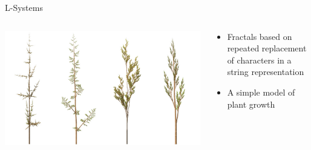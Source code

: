 \begin{frame}{L-Systems}
	\begin{columns}
		\begin{column}{0.4\textwidth}
			\includegraphics[width=\textwidth]{lsystem}
		\end{column}
		\begin{column}{0.55\textwidth}
			\begin{itemize}
                \pause\item Fractals based on repeated replacement of characters in a string representation
                \pause\item A simple model of plant growth
			\end{itemize}
		\end{column}
	\end{columns}
\end{frame}

